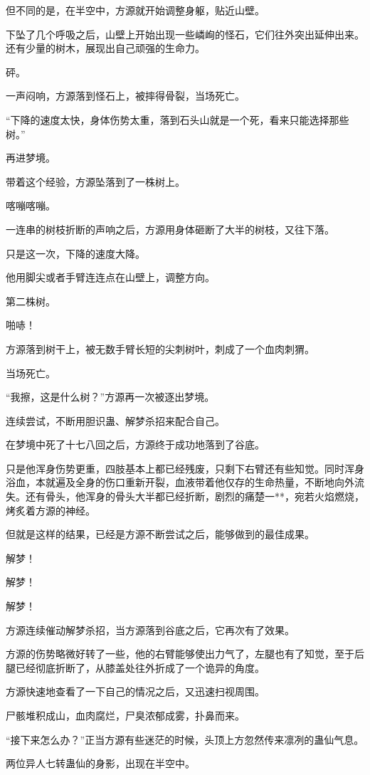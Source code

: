 \begin{this_body}
但不同的是，在半空中，方源就开始调整身躯，贴近山壁。

下坠了几个呼吸之后，山壁上开始出现一些嶙峋的怪石，它们往外突出延伸出来。还有少量的树木，展现出自己顽强的生命力。

砰。

一声闷响，方源落到怪石上，被摔得骨裂，当场死亡。

“下降的速度太快，身体伤势太重，落到石头山就是一个死，看来只能选择那些树。”

再进梦境。

带着这个经验，方源坠落到了一株树上。

喀嘣喀嘣。

一连串的树枝折断的声响之后，方源用身体砸断了大半的树枝，又往下落。

只是这一次，下降的速度大降。

他用脚尖或者手臂连连点在山壁上，调整方向。

第二株树。

啪哧！

方源落到树干上，被无数手臂长短的尖刺树叶，刺成了一个血肉刺猬。

当场死亡。

“我擦，这是什么树？”方源再一次被逐出梦境。

连续尝试，不断用胆识蛊、解梦杀招来配合自己。

在梦境中死了十七八回之后，方源终于成功地落到了谷底。

只是他浑身伤势更重，四肢基本上都已经残废，只剩下右臂还有些知觉。同时浑身浴血，本就遍及全身的伤口重新开裂，血液带着他仅存的生命热量，不断地向外流失。还有骨头，他浑身的骨头大半都已经折断，剧烈的痛楚一**，宛若火焰燃烧，烤炙着方源的神经。

但就是这样的结果，已经是方源不断尝试之后，能够做到的最佳成果。

解梦！

解梦！

解梦！

方源连续催动解梦杀招，当方源落到谷底之后，它再次有了效果。

方源的伤势略微好转了一些，他的右臂能够使出力气了，左腿也有了知觉，至于后腿已经彻底折断了，从膝盖处往外折成了一个诡异的角度。

方源快速地查看了一下自己的情况之后，又迅速扫视周围。

尸骸堆积成山，血肉腐烂，尸臭浓郁成雾，扑鼻而来。

“接下来怎么办？”正当方源有些迷茫的时候，头顶上方忽然传来凛冽的蛊仙气息。

两位异人七转蛊仙的身影，出现在半空中。


\end{this_body}
